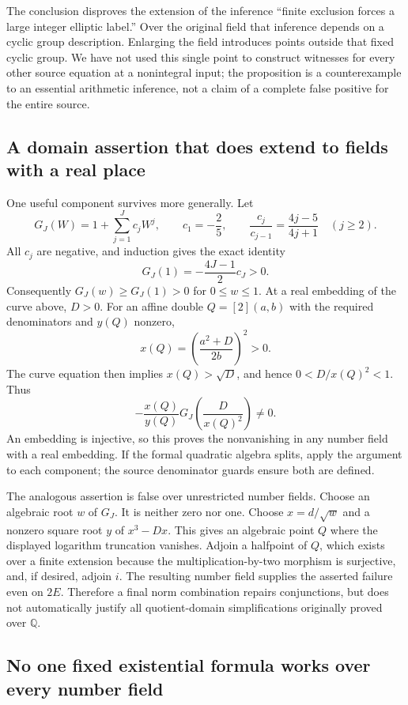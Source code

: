 \documentclass[11pt]{article}
\theoremstyle{definition}
\begin{document}
The conclusion disproves the extension of the inference
``finite exclusion forces a large integer elliptic label.''
Over the original field that inference depends on a cyclic
group description.  Enlarging the field introduces points
outside that fixed cyclic group.  We have not used this
single point to construct witnesses for every other source
equation at a nonintegral input; the proposition is a
counterexample to an essential arithmetic inference, not a
claim of a complete false positive for the entire source.

\subsection{A domain assertion that does extend to fields with a real place}

One useful component survives more generally.  Let
\[
 G_J(W)=1+\sum_{j=1}^J c_jW^j,\qquad
 c_1=-\frac25,\qquad
 \frac{c_j}{c_{j-1}}=\frac{4j-5}{4j+1}\quad(j\ge2).
\]
All $c_j$ are negative, and induction gives the exact identity
\[
                        G_J(1)=-\frac{4J-1}{2}c_J>0.
\]
Consequently $G_J(w)\ge G_J(1)>0$ for $0\le w\le1$.
At a real embedding of the curve above, $D>0$.  For an
affine double $Q=[2](a,b)$ with the required denominators
and $y(Q)$ nonzero,
\[
                  x(Q)=\left(\frac{a^2+D}{2b}\right)^2>0.
\]
The curve equation then implies $x(Q)>\sqrt D$, and hence
$0<D/x(Q)^2<1$.  Thus
\[
             -\frac{x(Q)}{y(Q)}G_J\!\left(\frac D{x(Q)^2}\right)
                          \ne0.
\]
An embedding is injective, so this proves the nonvanishing
in any number field with a real embedding.  If the formal
quadratic algebra splits, apply the argument to each component;
the source denominator guards ensure both are defined.

The analogous assertion is false over unrestricted number
fields.  Choose an algebraic root $w$ of $G_J$.  It is neither
zero nor one.  Choose $x=d/\sqrt w$ and a nonzero square root
$y$ of $x^3-Dx$.  This gives an algebraic point $Q$ where the
displayed logarithm truncation vanishes.  Adjoin a halfpoint
of $Q$, which exists over a finite extension because the
multiplication-by-two morphism is surjective, and, if desired,
adjoin $i$.  The resulting number field supplies the asserted
failure even on $2E$.  Therefore a final norm combination
repairs conjunctions, but does not automatically justify all
quotient-domain simplifications originally proved over
$\mathbb Q$.

\subsection{No one fixed existential formula works over every number field}
\end{document}
